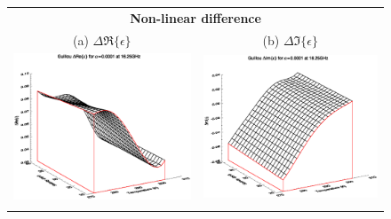 \begin{figure}[htp]
  \centering
  \begin{tabular}{c c}
    \multicolumn{2}{c}{\sffamily\textbf{Non-linear difference}}\\
    \textsf{(a)} $\Delta\Re\{\epsilon\}$ &
    \textsf{(b)} $\Delta\Im\{\epsilon\}$ \\
    \hspace{1.0em}\includegraphics[bb=127 240 508 540,clip,scale=0.5]{graphics/Guillou/FWDTL/FWDde_a0.0001_re_16.25GHz.eps} &
    \hspace{1.0em}\includegraphics[bb=127 240 508 540,clip,scale=0.5]{graphics/Guillou/FWDTL/FWDde_a0.0001_im_16.25GHz.eps} \\\\

\end{tabular}
\end{figure}
